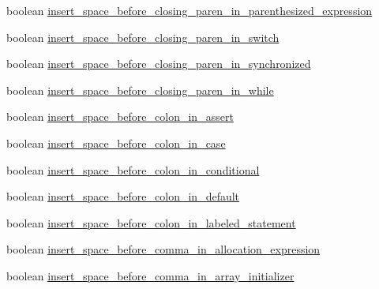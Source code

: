 \begin{DoxyCompactItemize}
\item 
boolean \hyperlink{classorg_1_1eclipse_1_1jdt_1_1ui_1_1tests_1_1refactoring_1_1infra_1_1TestFormatterOptions_a770b210dedfbd2136802fb4fa89fc0f4}{insert\_\-space\_\-before\_\-closing\_\-paren\_\-in\_\-parenthesized\_\-expression}
\item 
boolean \hyperlink{classorg_1_1eclipse_1_1jdt_1_1ui_1_1tests_1_1refactoring_1_1infra_1_1TestFormatterOptions_acb8785ce3021f675537f4bb50a727830}{insert\_\-space\_\-before\_\-closing\_\-paren\_\-in\_\-switch}
\item 
boolean \hyperlink{classorg_1_1eclipse_1_1jdt_1_1ui_1_1tests_1_1refactoring_1_1infra_1_1TestFormatterOptions_a7cf5fb06672b93ebf05e8d052ede6007}{insert\_\-space\_\-before\_\-closing\_\-paren\_\-in\_\-synchronized}
\item 
boolean \hyperlink{classorg_1_1eclipse_1_1jdt_1_1ui_1_1tests_1_1refactoring_1_1infra_1_1TestFormatterOptions_a6e61f9b9686098e152ad82ab5bf75a8f}{insert\_\-space\_\-before\_\-closing\_\-paren\_\-in\_\-while}
\item 
boolean \hyperlink{classorg_1_1eclipse_1_1jdt_1_1ui_1_1tests_1_1refactoring_1_1infra_1_1TestFormatterOptions_a470a3ae162756aac3ff641eb9871102a}{insert\_\-space\_\-before\_\-colon\_\-in\_\-assert}
\item 
boolean \hyperlink{classorg_1_1eclipse_1_1jdt_1_1ui_1_1tests_1_1refactoring_1_1infra_1_1TestFormatterOptions_a1bf11f42d80816fec0368f5f53bab85a}{insert\_\-space\_\-before\_\-colon\_\-in\_\-case}
\item 
boolean \hyperlink{classorg_1_1eclipse_1_1jdt_1_1ui_1_1tests_1_1refactoring_1_1infra_1_1TestFormatterOptions_acfcabdb3ba26e6b03fb6d4f82fb75c15}{insert\_\-space\_\-before\_\-colon\_\-in\_\-conditional}
\item 
boolean \hyperlink{classorg_1_1eclipse_1_1jdt_1_1ui_1_1tests_1_1refactoring_1_1infra_1_1TestFormatterOptions_a9d87e80e8d70ce09d1c805f1d25231f5}{insert\_\-space\_\-before\_\-colon\_\-in\_\-default}
\item 
boolean \hyperlink{classorg_1_1eclipse_1_1jdt_1_1ui_1_1tests_1_1refactoring_1_1infra_1_1TestFormatterOptions_a29b4a8c206cf6fb4e7e1e482e42d8774}{insert\_\-space\_\-before\_\-colon\_\-in\_\-labeled\_\-statement}
\item 
boolean \hyperlink{classorg_1_1eclipse_1_1jdt_1_1ui_1_1tests_1_1refactoring_1_1infra_1_1TestFormatterOptions_acfdf0ed04c2a7bd6cd0a08dfdfd450d6}{insert\_\-space\_\-before\_\-comma\_\-in\_\-allocation\_\-expression}
\item 
boolean \hyperlink{classorg_1_1eclipse_1_1jdt_1_1ui_1_1tests_1_1refactoring_1_1infra_1_1TestFormatterOptions_af9b4d29e23c57d41681a92193a6fef9b}{insert\_\-space\_\-before\_\-comma\_\-in\_\-array\_\-initializer}

\end{DoxyCompactItemize}
